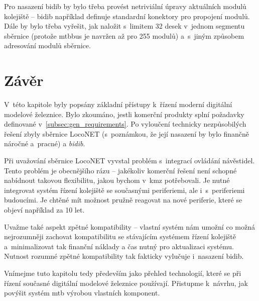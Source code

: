 Pro nasazení \gls{bidib} by bylo třeba provést netriviální úpravy
aktuálních modulů kolejiště – \gls{bidib} například definuje standardní
konektory pro propojení modulů. Dále by bylo třeba vyřešit, jak naložit
s~limitem 32 desek v~jednom segmentu sběrnice (protože \gls{mtbbus} je navržen
až pro 255 modulů) a~s~jiným způsobem adresování modulů sběrnice.
\section{Závěr}

V~této kapitole byly popsány základní přístupy k~řízení moderní digitální
modelové železnice. Bylo zkoumáno, jestli komerční produkty splní požadavky
definované v~\ref{subsec:gen_requirements}. Po vyloučení technicky
nezpůsobilých řešení zbyly sběrnice LocoNET (s~poznámkou,
že její nasazení by bylo finančně náročné a~pracné) a \textit{\gls{bidib}}.

Při uvažování sběrnice LocoNET vyvstal problém s~integrací ovládání
návěstidel. Tento problém je obecnějšího rázu – jakékoliv komerční řešení není
schopné nabídnout takovou flexibilitu, jakou bychom v~\gls{kmz} potřebovali.
Je nutné integrovat systém řízení kolejiště se současnými periferiemi, ale
i~s~periferiemi budoucími. Je chtěné mít možnost pružně reagovat na nové
periferie, které se objeví například za 10 let.

Uvažme také aspekt zpětné kompatibility – vlastní systém nám umožní co možná
nejrozumněji zachovat kompatibilitu se stávajícím systémem řízení kolejiště
a~minimalizovat tak finanční náklady a čas nutný pro aktualizaci systému.
Nutnost rozumné zpětné kompatibility tak fakticky vylučuje i~nasazení
\gls{bidib}.

Vnímejme tuto kapitolu tedy především jako přehled technologií, které se
při řízení současné digitální modelové železnice používají. Přistupme k~návrhu,
jak povýšit systém \gls{mtb} výrobou vlastních komponent.
